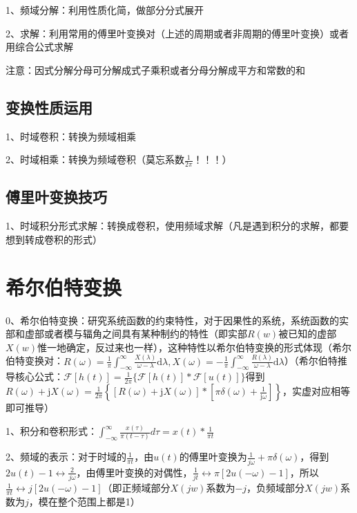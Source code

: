 1、频域分解：利用性质化简，做部分分式展开

2、求解：利用常用的傅里叶变换对（上述的周期或者非周期的傅里叶变换）或者用综合公式求解

注意：因式分解分母可分解成式子乘积或者分母分解成平方和常数的和



\subsection{变换性质运用}

1、时域卷积：转换为频域相乘

2、时域相乘：转换为频域卷积（莫忘系数$\frac{1}{2 \pi}$！！！）



\subsection{傅里叶变换技巧}

1、时域积分形式求解：转换成卷积，使用频域求解（凡是遇到积分的求解，都要想到转成卷积的形式）

\section{希尔伯特变换}

0、希尔伯特变换：研究系统函数的约束特性，对于因果性的系统，系统函数的实部和虚部或者模与辐角之间具有某种制约的特性（即实部$R(w)$被已知的虚部$X(w)$惟一地确定，反过来也一样），这种特性以希尔伯特变换的形式体现（希尔伯特变换对：$R(\omega)=\frac{1}{\pi} \int_{-\infty}^{\infty} \frac{X(\lambda)}{\omega-\lambda} \mathrm{d} \lambda,X(\omega)=-\frac{1}{\pi} \int_{-\infty}^{\infty} \frac{R(\lambda)}{\omega-\lambda} \mathrm{d} \lambda$）（希尔伯特推导核心公式：$\mathscr{F}[h(t)]=\frac{1}{2 \pi}\{\mathscr{F}[h(t)] * \mathscr{F}[u(t)]\}$得到$R(\omega)+\mathrm{j} X(\omega)=\frac{1}{2 \pi}\left\{[R(\omega)+\mathrm{j} X(\omega)] *\left[\pi \delta(\omega)+\frac{1}{\mathrm{j} \omega}\right]\right\}$，实虚对应相等即可推导）

1、积分和卷积形式：$\int_{-\infty}^{\infty}\frac{x(\tau)}{\pi (t-\tau)}d\tau = x(t) * \frac{1}{\pi t}$

2、频域的表示：对于时域的$\frac{1}{\pi t}$，由$u(t)$的傅里叶变换为$\frac{1}{j \omega}+\pi \delta(\omega)$，得到$2u(t)-1 \leftrightarrow \frac{2}{j \omega}$，由傅里叶变换的对偶性，$\frac{1}{j t} \leftrightarrow \pi[2u(-\omega)-1 ]$，所以$\frac{1}{\pi t} \leftrightarrow j[2u(-\omega)-1 ]$（即正频域部分$X(jw)$系数为$-j$，负频域部分$X(jw)$系数为$j$，模在整个范围上都是1）

